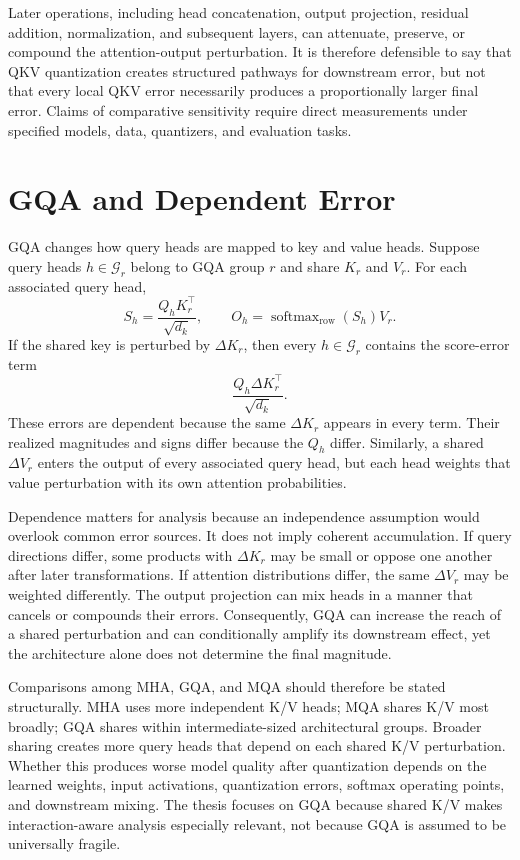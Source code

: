 Later operations, including head concatenation, output projection, residual addition, normalization, and subsequent layers, can attenuate, preserve, or compound the attention-output perturbation. It is therefore defensible to say that QKV quantization creates structured pathways for downstream error, but not that every local QKV error necessarily produces a proportionally larger final error. Claims of comparative sensitivity require direct measurements under specified models, data, quantizers, and evaluation tasks.

\section{GQA and Dependent Error}

GQA changes how query heads are mapped to key and value heads. Suppose query heads $h\in\mathcal{G}_r$ belong to GQA group $r$ and share $K_r$ and $V_r$. For each associated query head,
\begin{equation}
S_h=\frac{Q_hK_r^\top}{\sqrt{d_k}},
\qquad
O_h=\operatorname{softmax}_{\mathrm{row}}(S_h)V_r.
\end{equation}
If the shared key is perturbed by $\Delta K_r$, then every $h\in\mathcal{G}_r$ contains the score-error term
\begin{equation}
\frac{Q_h\Delta K_r^\top}{\sqrt{d_k}}.
\end{equation}
These errors are dependent because the same $\Delta K_r$ appears in every term. Their realized magnitudes and signs differ because the $Q_h$ differ. Similarly, a shared $\Delta V_r$ enters the output of every associated query head, but each head weights that value perturbation with its own attention probabilities.

Dependence matters for analysis because an independence assumption would overlook common error sources. It does not imply coherent accumulation. If query directions differ, some products with $\Delta K_r$ may be small or oppose one another after later transformations. If attention distributions differ, the same $\Delta V_r$ may be weighted differently. The output projection can mix heads in a manner that cancels or compounds their errors. Consequently, GQA can increase the reach of a shared perturbation and can conditionally amplify its downstream effect, yet the architecture alone does not determine the final magnitude.

Comparisons among MHA, GQA, and MQA should therefore be stated structurally. MHA uses more independent K/V heads; MQA shares K/V most broadly; GQA shares within intermediate-sized architectural groups. Broader sharing creates more query heads that depend on each shared K/V perturbation. Whether this produces worse model quality after quantization depends on the learned weights, input activations, quantization errors, softmax operating points, and downstream mixing. The thesis focuses on GQA because shared K/V makes interaction-aware analysis especially relevant, not because GQA is assumed to be universally fragile.

